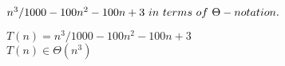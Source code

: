 \documentclass{article}
\begin{document}
$n^3/1000 - 100n^2 - 100n + 3\ in\ terms\ of\ \Theta-notation.\\$


$T(n) = n^3/1000 - 100n^2 - 100n + 3$\\

$T(n) \in \Theta(n^3)$\\
\end{document}
